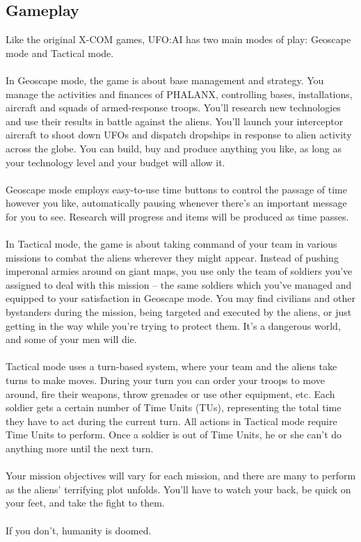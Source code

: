 \subsection{Gameplay}
Like the original X-COM games, UFO:AI has two main modes of play: Geoscape mode and Tactical mode.\\
\\
In Geoscape mode, the game is about base management and strategy. You manage the activities and finances of PHALANX, controlling bases, installations, aircraft and squads of armed-response troops. You'll research new technologies and use their results in battle against the aliens. You'll launch your interceptor aircraft to shoot down UFOs and dispatch dropships in response to alien activity across the globe. You can build, buy and produce anything you like, as long as your technology level and your budget will allow it.\\
\\
Geoscape mode employs easy-to-use time buttons to control the passage of time however you like, automatically pausing whenever there's an important message for you to see. Research will progress and items will be produced as time passes.\\
\\
In Tactical mode, the game is about taking command of your team in various missions to combat the aliens wherever they might appear. Instead of pushing imperonal armies around on giant maps, you use only the team of soldiers you've assigned to deal with this mission -- the same soldiers which you've managed and equipped to your satisfaction in Geoscape mode. You may find civilians and other bystanders during the mission, being targeted and executed by the aliens, or just getting in the way while you're trying to protect them. It's a dangerous world, and some of your men will die.\\
\\
Tactical mode uses a turn-based system, where your team and the aliens take turns to make moves. During your turn you can order your troops to move around, fire their weapons, throw grenades or use other equipment, etc. Each soldier gets a certain number of Time Units (TUs), representing the total time they have to act during the current turn. All actions in Tactical mode require Time Units to perform. Once a soldier is out of Time Units, he or she can't do anything more until the next turn.\\
\\
Your mission objectives will vary for each mission, and there are many to perform as the aliens' terrifying plot unfolds. You'll have to watch your back, be quick on your feet, and take the fight to them.\\
\\
If you don't, humanity is doomed.


